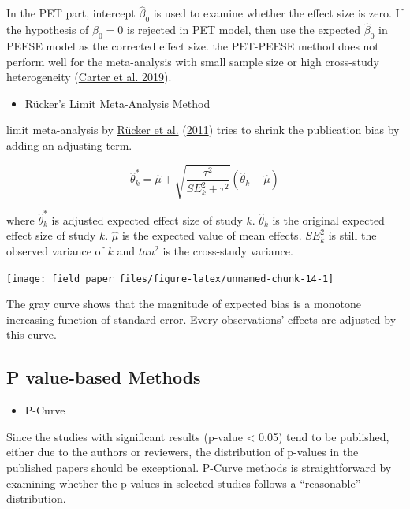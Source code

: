 \documentclass[
  11pt,
  openany]{memoir}
\providecommand{\tightlist}{%
  \setlength{\itemsep}{0pt}\setlength{\parskip}{0pt}}
\begin{document}
In the PET part, intercept \(\hat\beta_0\) is used to examine whether the effect size is zero.
If the hypothesis of \(\beta_0=0\) is rejected in PET model, then use the expected \(\hat\beta_0\) in PEESE model as the corrected effect size.
the PET-PEESE method does not perform well for the meta-analysis with small sample size or high cross-study heterogeneity (\protect\hyperlink{ref-carterCorrectingBiasPsychology2019}{Carter et al. 2019}).

\begin{itemize}
\tightlist
\item
  Rücker's Limit Meta-Analysis Method
\end{itemize}

limit meta-analysis by \protect\hyperlink{ref-ruckerTreatmenteffectEstimatesAdjusted2011}{Rücker et al.} (\protect\hyperlink{ref-ruckerTreatmenteffectEstimatesAdjusted2011}{2011}) tries to shrink the publication bias by adding an adjusting term.

\begin{equation}
\hat\theta^*_k =  \hat\mu + \sqrt{\dfrac{\tau^2}{SE^2_k + \tau^2}}(\hat\theta_k - \hat\mu)
\end{equation}

where \(\hat\theta^*_k\) is adjusted expected effect size of study \(k\). \(\hat\theta_k\) is the original expected effect size of study \(k\). \(\hat\mu\) is the expected value of mean effects. \(SE^2_k\) is still the observed variance of \(k\) and \(tau^2\) is the cross-study variance.

\begin{center}\texttt{[image: field\_paper\_files/figure-latex/unnamed-chunk-14-1]} \end{center}

The gray curve shows that the magnitude of expected bias is a monotone increasing function of standard error. Every observations' effects are adjusted by this curve.

\hypertarget{p-value-based-methods}{%
\subsection{P value-based Methods}\label{p-value-based-methods}}

\begin{itemize}
\tightlist
\item
  P-Curve
\end{itemize}

Since the studies with significant results (p-value \textless{} 0.05) tend to be published, either due to the authors or reviewers, the distribution of p-values in the published papers should be exceptional.
P-Curve methods is straightforward by examining whether the p-values in selected studies follows a ``reasonable'' distribution.
\end{document}
